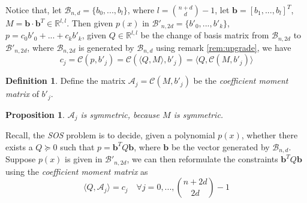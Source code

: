 \documentclass[12pt]{amsart}
\numberwithin{equation}{section}
\newtheorem{prop}[thm]{Proposition}
\theoremstyle{definition}
\newtheorem{definition}[thm]{Definition}
\numberwithin{thm}{section}
\begin{document}
\smallskip
Notice that, let $\mathcal{B}_{n, d} = \{b_0,...,b_l\}$, where $l = {n + d \choose d} - 1$, 
let $\mathbf{b} = [b_1, ..., b_l]^T$, $M = \mathbf{b} \cdot \mathbf{b}^T \in \mathbb{R}^{l, l}$. 
Then given $p(x)$ in $\mathcal{B}'_{n, 2d} = \{b'_0, ..., b'_k\}$, $p = c_0b'_0 + ... + c_k b'_k$, 
given $Q \in \mathbb{R}^{l, l}$ be the change of basis matrix from $\mathcal{B}_{n, 2d}$ to $\mathcal{B}'_{n, 2d}$, 
where $\mathcal{B}_{n, 2d}$ is generated by $\mathcal{B}_{n, d}$ using remark \ref{rem:upgrade}, we have
\begin{equation}
     c_j = \mathcal{C}(p, b'_j) = \mathcal{C}(\langle Q, M \rangle, b'_j ) = \langle Q, \mathcal{C}(M, b'_j) \rangle
\end{equation}

\begin{definition}
Define the matrix $\mathcal{A}_j = \mathcal{C}(M, b'_j)$ be the \emph{coefficient moment matrix} of $b'_j$.
\end{definition}

\begin{prop}
     $\mathcal{A}_j$ is symmetric, because $M$ is symmetric.
\end{prop}

\smallskip
Recall, the \emph{SOS} problem is to decide, given a polynomial $p(x)$, 
whether there exists a $Q \succcurlyeq 0$ such that $p = \mathbf{b}^TQ \mathbf{b}$, where $\mathbf{b}$ be the vector generated by $\mathcal{B}_{n, d}$.
Suppose $p(x)$ is given in $\mathcal{B'}_{n, 2d}$, we can then reformulate the constraints $\mathbf{b}^TQ \mathbf{b}$ using the \emph{coefficient moment matrix} as
\begin{equation}
     \langle Q, \mathcal{A}_j \rangle = c_j \quad \forall j = 0,...,{n + 2d \choose 2d} - 1
\end{equation} 
\end{document}
